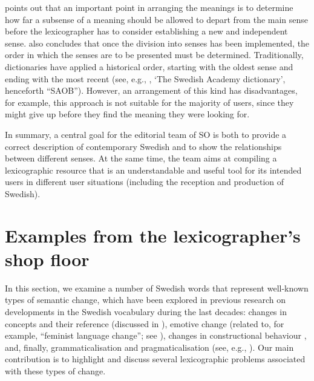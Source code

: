 \documentclass[output=paper]{langscibook}
\begin{document}
\citet{svensen2009} points out that an important point in arranging the meanings is to determine how far a subsense of a meaning should be allowed to depart from the main sense before the lexicographer has to consider establishing a new and independent sense. \citet[212, 363]{svensen2009}
also concludes that once the division into senses has been implemented, the order in which the senses are to be presented must be determined.
Traditionally, dictionaries have applied a historical order, starting with the oldest sense and ending with the most recent (see, e.g., , `The Swedish Academy dictionary', henceforth ``SAOB''). However, an arrangement of this kind has disadvantages, for example, this approach is not suitable for the majority of users, since they might give up before they find the meaning they were looking for.   

In summary, a central goal for the editorial team of SO is both to provide a correct description of contemporary Swedish and to show the relationships between different senses. At the same time, the team aims at compiling a lexicographic resource that is an understandable and useful tool for its intended users in different user situations (including the reception and production of Swedish).

\section{Examples from the lexicographer's shop floor}
\label{sec:examples}
In this section, we examine a number of Swedish words that represent well-known types of semantic change, which have been explored in previous research on developments in the Swedish vocabulary during the last decades: changes in concepts and their reference (discussed in \citealt{svensen2009}), emotive change (related to, for example, ``feminist language change''; see \citealt[35--52]{Wojahn2015}), changes in constructional behaviour \citep{malmgren2003}, and, finally, grammaticalisation and pragmaticalisation (see, e.g., \citealt{rosenkvist2011}). Our main contribution is to highlight and discuss several lexicographic problems associated with these types of change. 
\end{document}
